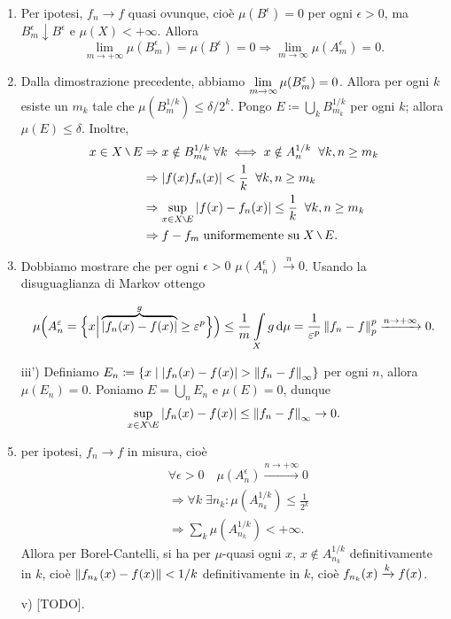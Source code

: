 \documentclass[a4paper, 12pt]{report}
\begin{document}
\begin{enumerate}
\item Per ipotesi, $f_n \to f$ quasi ovunque, cioè $\mu(B^\epsilon) = 0$ per ogni $\epsilon > 0$, ma $B_m^\epsilon \downarrow B^\epsilon$ e $\mu(X) < +\infty$.
Allora
%
$$
\lim_{m \to +\infty} \mu(B_m^\epsilon) = \mu(B^\epsilon) = 0 \Rightarrow \lim_{m \to \infty} \mu(A_m^\epsilon) = 0.
$$
%

\item Dalla dimostrazione precedente, abbiamo $\displaystyle \lim_{m \to \infty} \mu(B_m^\varepsilon) = 0$. 
Allora per ogni $k$ esiste un $m_k$ tale che $\mu \left( B_m^{1/k} \right) \leq \delta / 2^k$.
Pongo $E \coloneqq  \bigcup_{k} B_{m_k}^{1/k}$ per ogni $k$; allora $\mu(E) \leq \delta$.
Inoltre,
\begin{align*}
x \in X \setminus E & \Rightarrow x \notin B_{m_k}^{1/k} \; \forall k \iff x \notin A_n^{1/k} \mquad \forall k,n \geq m_ k \\
& \Rightarrow \left| f(x) f_n(x) \right| < \frac{1}{k} \mquad \forall k,n \geq m_k \\
& \Rightarrow \sup_{x \in X \setminus E} \left| f(x) - f_n(x) \right| \leq \frac{1}{k} \mquad \forall k,n \geq m_k \\
& \Rightarrow f - f_m \; \text{uniformemente su} \; X \setminus E.
\end{align*}

\item Dobbiamo mostrare che per ogni $\epsilon > 0$ $\mu(A_n^\epsilon) \xrightarrow{n} 0$.
Usando la disuguaglianza di Markov ottengo

%
$$
\mu \Big( A_n^\epsilon= \Big\{ x \Big| \overbrace{\left| f_n(x) - f(x) \right|}^{g} \geq \epsilon^p \Big\} \Big)
\leq \frac{1}{m} \int\limits_{\mathclap{X}}^{} g \dd \mu = \frac{1}{\epsilon^p} \norm{f_n - f}_p^p \xrightarrow{n \to +\infty} 0.
$$
%

\item[iii')] Definiamo $\displaystyle E_n \coloneqq  \left\{ x \;\middle|\; \left| f_n(x) - f(x) \right| > \left\lVert f_n - f \right\rVert_\infty \right\}$ per ogni $n$, allora $\mu(E_n) = 0$.
Poniamo $E = \bigcup_{n} E_n$ e $\mu(E) = 0$, dunque
%
$$
\sup_{x \in X\setminus E} \left| f_n(x) - f(x) \right| \leq \norm{f_n - f}_\infty \to 0.
$$
%


\item per ipotesi, $f_n \to f$ in misura, cioè
\begin{align*}
& \forall \epsilon > 0 \quad \mu \left( A_n^\epsilon \right) \xrightarrow{n \to +\infty} 0 \\
& \Rightarrow \forall k \; \exists n_k \colon \mu \left( A_{n_k}^{1/k} \right) \leq \frac{1}{2^k} \\
& \Rightarrow \sum_{k}^{} \mu \left( A_{n_k}^{1/k} \right) < +\infty. 
\end{align*}
Allora per Borel-Cantelli, si ha per $\mu$-quasi ogni $x$, $x \notin A_{n_k}^{1/k}$ definitivamente in $k$, cioè $\left\lVert f_{n_k}(x) - f(x) \right\rVert < 1/k$ definitivamente in $k$, cioè $\displaystyle f_{n_k}(x) \xrightarrow{k} f(x)$.

\item[v)] [TODO].

\end{enumerate}
\end{document}
